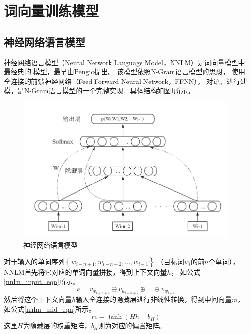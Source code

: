 \documentclass{standalone}
\begin{document}
\section{词向量训练模型}
\subsection{神经网络语言模型}
神经网络语言模型（Neural Network Language Model，NNLM）是词向量模型中最经典的
模型，最早由Bengio提出。
该模型依照N-Gram语言模型的思想，
使用全连接的前馈神经网络（Feed Forward Neural Network，FFNN），
对语言进行建模，是N-Gram语言模型的一个完整实现，具体结构如图\ref{nnlm}所示。
\begin{figure}[h]
    \includegraphics[scale=0.5]{picture/nnlm.png}
    \caption{神经网络语言模型}
    \label{nnlm}
\end{figure}

对于输入的单词序列$\left \{ w_{i-n+1},w_{i-n+2},...,w_{i-1} \right \}$
（目标词$w_i$的前$n$个单词），NNLM首先将它对应的单词向量拼接，得到上下文向量$h$，
如公式\ref{nnlm_input_eqn}所示。
\begin{equation}
    h = v_{w_{i-n+1}} \oplus v_{w_{i-n+2}} \oplus ... \oplus v_{w_{i-1}}
    \label{nnlm_input_eqn}
\end{equation}
然后将这个上下文向量$h$输入全连接的隐藏层进行非线性转换，得到中间向量$m$，
如公式\ref{nnlm_mid_eqn}所示。
\begin{equation}
    m = \tanh \left ( Hh+b_H \right )
    \label{nnlm_mid_eqn}
\end{equation}
这里$H$为隐藏层的权重矩阵，$b_H$则为对应的偏置矩阵。
\end{document}
